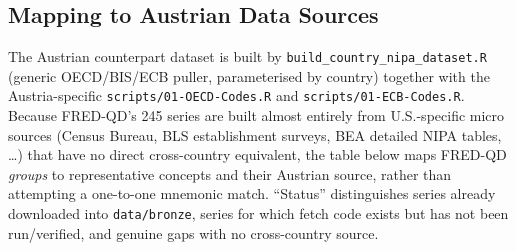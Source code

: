 \documentclass[11pt]{article}
\begin{document}
\begin{landscape}
\section*{Mapping to Austrian Data Sources}

The Austrian counterpart dataset is built by \texttt{build\_\allowbreak{}country\_\allowbreak{}nipa\_\allowbreak{}dataset.\allowbreak{}R} (generic OECD/BIS/ECB puller, parameterised by country) together with the Austria-specific \texttt{scripts/\allowbreak{}01-OECD-Codes.\allowbreak{}R} and \texttt{scripts/\allowbreak{}01-ECB-Codes.\allowbreak{}R}. Because FRED-QD's 245 series are built almost entirely from U.S.-specific micro sources (Census Bureau, BLS establishment surveys, BEA detailed NIPA tables, \ldots) that have no direct cross-country equivalent, the table below maps FRED-QD \emph{groups} to representative concepts and their Austrian source, rather than attempting a one-to-one mnemonic match. ``Status'' distinguishes series already downloaded into \texttt{data/bronze}, series for which fetch code exists but has not been run/verified, and genuine gaps with no cross-country source.


\end{landscape}
\end{document}
